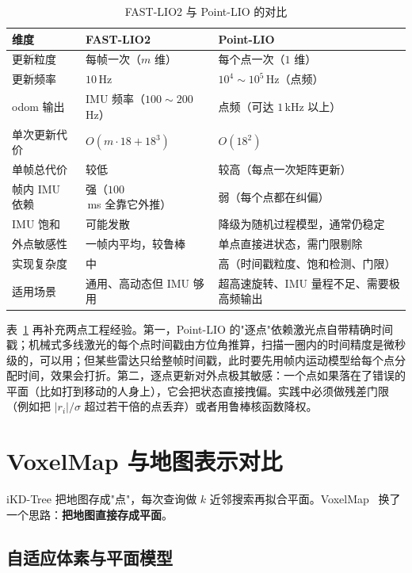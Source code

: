 \begin{table}[htbp]
  \centering
  \caption{FAST-LIO2 与 Point-LIO 的对比}\label{tab:17-compare}
  \footnotesize
  \begin{tabular}{lll}
    \toprule
    维度 & FAST-LIO2 & Point-LIO \\
    \midrule
    更新粒度 & 每帧一次（$m$ 维） & 每个点一次（$1$ 维） \\
    更新频率 & $10$\,Hz & $10^4\sim10^5$\,Hz（点频） \\
    odom 输出 & IMU 频率（$100\sim200$\,Hz） & 点频（可达 $1$\,kHz 以上） \\
    单次更新代价 & $O(m\cdot18+18^3)$ & $O(18^2)$ \\
    单帧总代价 & 较低 & 较高（每点一次矩阵更新） \\
    帧内 IMU 依赖 & 强（$100$\,ms 全靠它外推） & 弱（每个点都在纠偏） \\
    IMU 饱和 & 可能发散 & 降级为随机过程模型，通常仍稳定 \\
    外点敏感性 & 一帧内平均，较鲁棒 & 单点直接进状态，需门限剔除 \\
    实现复杂度 & 中 & 高（时间戳粒度、饱和检测、门限） \\
    适用场景 & 通用、高动态但 IMU 够用 & 超高速旋转、IMU 量程不足、需要极高频输出 \\
    \bottomrule
  \end{tabular}
\end{table}

表~\ref{tab:17-compare} 再补充两点工程经验。第一，Point-LIO 的"逐点"依赖激光点自带精确时间戳；机械式多线激光的每个点时间戳由方位角推算，扫描一圈内的时间精度是微秒级的，可以用；但某些雷达只给整帧时间戳，此时要先用帧内运动模型给每个点分配时间，效果会打折。第二，逐点更新对外点极其敏感：一个点如果落在了错误的平面（比如打到移动的人身上），它会把状态直接拽偏。实践中必须做残差门限（例如把 $|r_i|/\sigma$ 超过若干倍的点丢弃）或者用鲁棒核函数降权。

\section{VoxelMap 与地图表示对比}\label{sec:17-voxelmap}

iKD-Tree 把地图存成"点"，每次查询做 $k$ 近邻搜索再拟合平面。VoxelMap~\cite{yuan2022voxelmap} 换了一个思路：\textbf{把地图直接存成平面}。

\subsection{自适应体素与平面模型}

